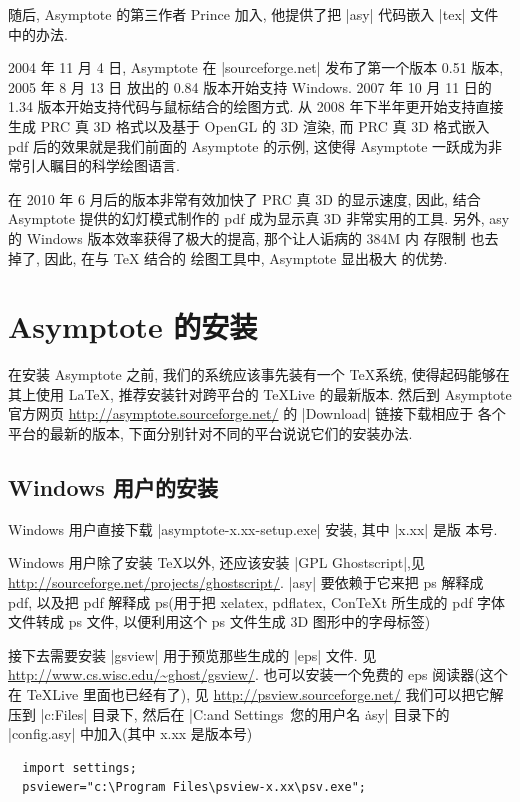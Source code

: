 \documentclass[nofonts,CJKnormalspaces]{ctexbook}[2009/05/20]
\begin{document}
随后, Asymptote 的第三作者 Prince 加入, 他提供了把 |asy| 代码嵌入
|tex| 文件中的办法.

2004 年 11 月 4 日, Asymptote 在 |sourceforge.net| 发布了第一个版本
0.51 版本, 2005 年 8 月 13 日 放出的 0.84 版本开始支持 Windows. 2007
年 10 月 11 日的 1.34 版本开始支持代码与鼠标结合的绘图方式. 从 2008
年下半年更开始支持直接生成 PRC 真 3D 格式以及基于 OpenGL 的 3D 渲染,
而 PRC 真 3D 格式嵌入 pdf 后的效果就是我们前面的 Asymptote 的示例, 这使得
Asymptote 一跃成为非常引人瞩目的科学绘图语言.

在 2010 年 6 月后的版本非常有效加快了 PRC 真 3D 的显示速度, 因此,
结合 Asymptote 提供的幻灯模式制作的 pdf 成为显示真 3D 非常实用的工具.
另外, asy 的 Windows 版本效率获得了极大的提高, 那个让人诟病的 384M 内
存限制 也去掉了, 因此, 在与 TeX 结合的 绘图工具中, Asymptote 显出极大
的优势.

\section{Asymptote 的安装}
在安装 Asymptote 之前, 我们的系统应该事先装有一个 \TeX 系统,
使得起码能够在其上使用 \LaTeX, 推荐安装针对跨平台的 TeXLive 的最新版本.
然后到 Asymptote官方网页
\url{http://asymptote.sourceforge.net/} 的 |Download| 链接下载相应于
各个平台的最新的版本, 下面分别针对不同的平台说说它们的安装办法.

\subsection{Windows 用户的安装}
Windows 用户直接下载 |asymptote-x.xx-setup.exe| 安装, 其中 |x.xx| 是版
本号.

Windows 用户除了安装 \TeX 以外, 还应该安装 |GPL Ghostscript|,见
\url{http://sourceforge.net/projects/ghostscript/}.
|asy| 要依赖于它来把 ps 解释成 pdf, 以及把 pdf 解释成 ps(用于把 xelatex,
pdflatex, ConTeXt 所生成的 pdf 字体文件转成 ps 文件, 以便利用这个 ps
文件生成 3D 图形中的字母标签)

接下去需要安装 |gsview| 用于预览那些生成的 |eps| 文件.
见 \url{http://www.cs.wisc.edu/~ghost/gsview/}.
也可以安装一个免费的 eps 阅读器(这个在 TeXLive 里面也已经有了), 见
\url{http://psview.sourceforge.net/} 我们可以把它解压到
|c:\Program Files| 目录下, 然后在
|C:\Documents and Settings\ 您的用户名 \.asy|
目录下的 |config.asy| 中加入(其中 x.xx 是版本号)
\begin{lstlisting}
  import settings;
  psviewer="c:\Program Files\psview-x.xx\psv.exe";
\end{lstlisting}
\end{document}
